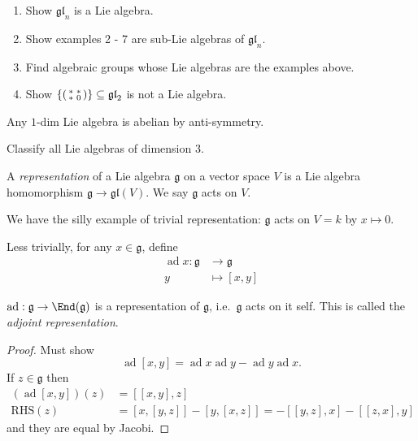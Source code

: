 \documentclass[a4paper]{article}
\newcommand*{\Lie}[1]{\mathfrak{#1}} %
\DeclareMathOperator{\ad}{ad} %
\begin{document}
\begin{ex}\leavevmode
  \begin{enumerate}
  \item Show \(\Lie{gl}_n\) is a Lie algebra.
  \item Show examples 2 - 7 are sub-Lie algebras of \(\Lie{gl}_n\).
  \item Find algebraic groups whose Lie algebras are the examples above.
  \item Show \(\{
    \begin{psmallmatrix}
      * & * \\
      * & 0
    \end{psmallmatrix}
    \} \subseteq \Lie{gl}_2\) is not a Lie algebra.
  \end{enumerate}
\end{ex}

\begin{eg}
  Any \(1\)-dim Lie algebra is abelian by anti-symmetry.
\end{eg}

\begin{ex}
  Classify all Lie algebras of dimension \(3\).
\end{ex}

\begin{definition}[representation]
  A \emph{representation} of a Lie algebra \(\Lie g\) on a vector space \(V\) is a Lie algebra homomorphism \(\Lie g \to \Lie{gl}(V)\). We say \(\Lie g\) acts on \(V\).
\end{definition}

We have the silly example of trivial representation: \(\Lie g\) acts on \(V = k\) by \(x \mapsto 0\).

Less trivially, for any \(x \in \Lie g\), define
\begin{align*}
  \ad x: \Lie g &\to \Lie g \\
  y &\mapsto [x, y]
\end{align*}

\begin{lemma}
  \(\ad: \Lie g \to \End(\Lie g)\) is a representation of \(\Lie g\), i.e.\ \(\Lie g\) acts on it self. This is called the \emph{adjoint representation}.
\end{lemma}

\begin{proof}
  Must show
  \[
    \ad [x, y] = \ad x \ad y - \ad y \ad x.
  \]
  If \(z \in \Lie g\) then
  \begin{align*}
    (\ad [x, y])(z) &= [[x, y], z] \\
    \text{RHS}(z) &= [x, [y, z]] - [y, [x, z]] = -[[y, z], x] - [[z, x], y]
  \end{align*}
  and they are equal by Jacobi.
\end{proof}
\end{document}
